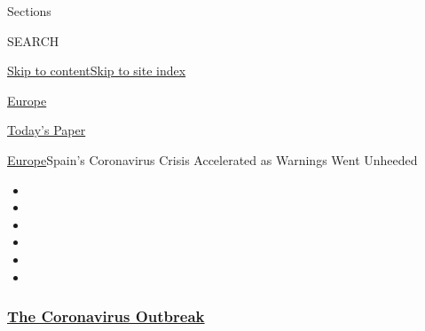 Sections

SEARCH

\protect\hyperlink{site-content}{Skip to
content}\protect\hyperlink{site-index}{Skip to site index}

\href{https://www.nytimes3xbfgragh.onion/section/world/europe}{Europe}

\href{https://myaccount.nytimes3xbfgragh.onion/auth/login?response_type=cookie\&client_id=vi}{}

\href{https://www.nytimes3xbfgragh.onion/section/todayspaper}{Today's
Paper}

\href{/section/world/europe}{Europe}\textbar{}Spain's Coronavirus Crisis
Accelerated as Warnings Went Unheeded

\begin{itemize}
\item
\item
\item
\item
\item
\item
\end{itemize}

\hypertarget{the-coronavirus-outbreak}{%
\subsubsection{\texorpdfstring{\href{https://www.nytimes3xbfgragh.onion/news-event/coronavirus?name=styln-coronavirus-national\&region=TOP_BANNER\&block=storyline_menu_recirc\&action=click\&pgtype=Article\&impression_id=558520d0-f1c9-11ea-8e0c-1398ceb9913f\&variant=undefined}{The
Coronavirus
Outbreak}}{The Coronavirus Outbreak}}\label{the-coronavirus-outbreak}}

